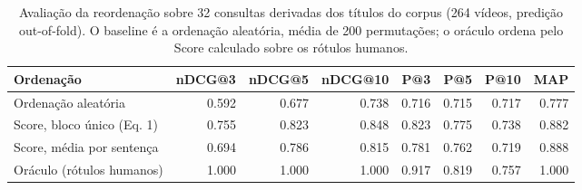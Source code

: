 \begin{table}[!t]
\caption{Avaliação da reordenação sobre 32 consultas derivadas dos títulos do corpus (264 vídeos, predição out-of-fold). O baseline é a ordenação aleatória, média de 200 permutações; o oráculo ordena pelo Score calculado sobre os rótulos humanos.}\label{tab:reranking}
\begin{tabular*}{\tblwidth}{@{}LRRRRRRR@{}}
\toprule
Ordenação & nDCG@3 & nDCG@5 & nDCG@10 & P@3 & P@5 & P@10 & MAP \\
\midrule
Ordenação aleatória & 0.592 & 0.677 & 0.738 & 0.716 & 0.715 & 0.717 & 0.777 \\
Score, bloco único (Eq. 1) & 0.755 & 0.823 & 0.848 & 0.823 & 0.775 & 0.738 & 0.882 \\
Score, média por sentença & 0.694 & 0.786 & 0.815 & 0.781 & 0.762 & 0.719 & 0.888 \\
Oráculo (rótulos humanos) & 1.000 & 1.000 & 1.000 & 0.917 & 0.819 & 0.757 & 1.000 \\
\bottomrule
\end{tabular*}
\end{table}

